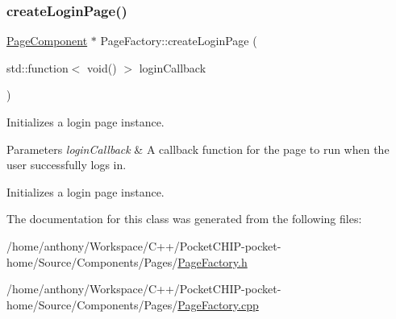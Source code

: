 \subsubsection{\texorpdfstring{create\+Login\+Page()}{createLoginPage()}}
{\footnotesize\ttfamily \mbox{\hyperlink{classPageComponent}{Page\+Component}} $\ast$ Page\+Factory\+::create\+Login\+Page (\begin{DoxyParamCaption}\item[{std\+::function$<$ void() $>$}]{login\+Callback }\end{DoxyParamCaption})}

Initializes a login page instance.


\begin{DoxyParams}{Parameters}
{\em login\+Callback} & A callback function for the page to run when the user successfully logs in.\\
\hline
\end{DoxyParams}
Initializes a login page instance. 

The documentation for this class was generated from the following files\+:\begin{DoxyCompactItemize}
\item 
/home/anthony/\+Workspace/\+C++/\+Pocket\+C\+H\+I\+P-\/pocket-\/home/\+Source/\+Components/\+Pages/\mbox{\hyperlink{PageFactory_8h}{Page\+Factory.\+h}}\item 
/home/anthony/\+Workspace/\+C++/\+Pocket\+C\+H\+I\+P-\/pocket-\/home/\+Source/\+Components/\+Pages/\mbox{\hyperlink{PageFactory_8cpp}{Page\+Factory.\+cpp}}\end{DoxyCompactItemize}
